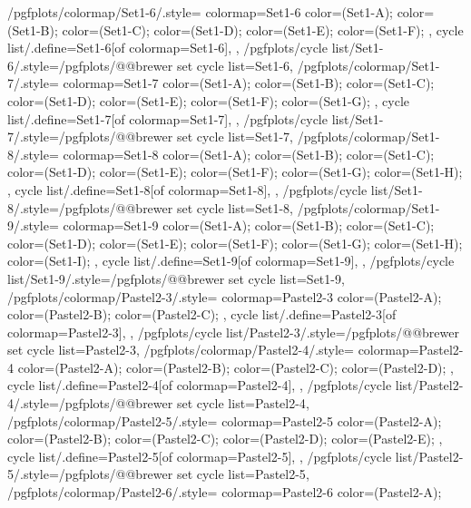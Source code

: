 {  %
  /pgfplots/colormap/Set1-6/.style={
    colormap={Set1-6}{
      color=(Set1-A);
      color=(Set1-B);
      color=(Set1-C);
      color=(Set1-D);
      color=(Set1-E);
      color=(Set1-F);
    },
    cycle list/.define={Set1-6}{[of colormap=Set1-6]},
  },
  /pgfplots/cycle list/Set1-6/.style={/pgfplots/@@brewer set cycle list={Set1-6}},
  /pgfplots/colormap/Set1-7/.style={
    colormap={Set1-7}{
      color=(Set1-A);
      color=(Set1-B);
      color=(Set1-C);
      color=(Set1-D);
      color=(Set1-E);
      color=(Set1-F);
      color=(Set1-G);
    },
    cycle list/.define={Set1-7}{[of colormap=Set1-7]},
  },
  /pgfplots/cycle list/Set1-7/.style={/pgfplots/@@brewer set cycle list={Set1-7}},
  /pgfplots/colormap/Set1-8/.style={
    colormap={Set1-8}{
      color=(Set1-A);
      color=(Set1-B);
      color=(Set1-C);
      color=(Set1-D);
      color=(Set1-E);
      color=(Set1-F);
      color=(Set1-G);
      color=(Set1-H);
    },
    cycle list/.define={Set1-8}{[of colormap=Set1-8]},
  },
  /pgfplots/cycle list/Set1-8/.style={/pgfplots/@@brewer set cycle list={Set1-8}},
  /pgfplots/colormap/Set1-9/.style={
    colormap={Set1-9}{
      color=(Set1-A);
      color=(Set1-B);
      color=(Set1-C);
      color=(Set1-D);
      color=(Set1-E);
      color=(Set1-F);
      color=(Set1-G);
      color=(Set1-H);
      color=(Set1-I);
    },
    cycle list/.define={Set1-9}{[of colormap=Set1-9]},
  },
  /pgfplots/cycle list/Set1-9/.style={/pgfplots/@@brewer set cycle list={Set1-9}},
  /pgfplots/colormap/Pastel2-3/.style={
    colormap={Pastel2-3}{
      color=(Pastel2-A);
      color=(Pastel2-B);
      color=(Pastel2-C);
    },
    cycle list/.define={Pastel2-3}{[of colormap=Pastel2-3]},
  },
  /pgfplots/cycle list/Pastel2-3/.style={/pgfplots/@@brewer set cycle list={Pastel2-3}},
  /pgfplots/colormap/Pastel2-4/.style={
    colormap={Pastel2-4}{
      color=(Pastel2-A);
      color=(Pastel2-B);
      color=(Pastel2-C);
      color=(Pastel2-D);
    },
    cycle list/.define={Pastel2-4}{[of colormap=Pastel2-4]},
  },
  /pgfplots/cycle list/Pastel2-4/.style={/pgfplots/@@brewer set cycle list={Pastel2-4}},
  /pgfplots/colormap/Pastel2-5/.style={
    colormap={Pastel2-5}{
      color=(Pastel2-A);
      color=(Pastel2-B);
      color=(Pastel2-C);
      color=(Pastel2-D);
      color=(Pastel2-E);
    },
    cycle list/.define={Pastel2-5}{[of colormap=Pastel2-5]},
  },
  /pgfplots/cycle list/Pastel2-5/.style={/pgfplots/@@brewer set cycle list={Pastel2-5}},
  /pgfplots/colormap/Pastel2-6/.style={
    colormap={Pastel2-6}{
      color=(Pastel2-A);
}}}
